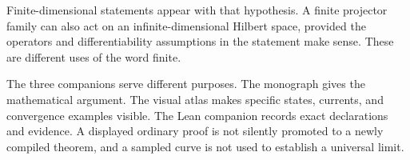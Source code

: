 Finite-dimensional statements appear with that hypothesis. A finite projector family can also act on an infinite-dimensional Hilbert space, provided the operators and differentiability assumptions in the statement make sense. These are different uses of the word finite.

The three companions serve different purposes. The monograph gives the mathematical argument. The visual atlas makes specific states, currents, and convergence examples visible. The Lean companion records exact declarations and evidence. A displayed ordinary proof is not silently promoted to a newly compiled theorem, and a sampled curve is not used to establish a universal limit.

\clearpage
